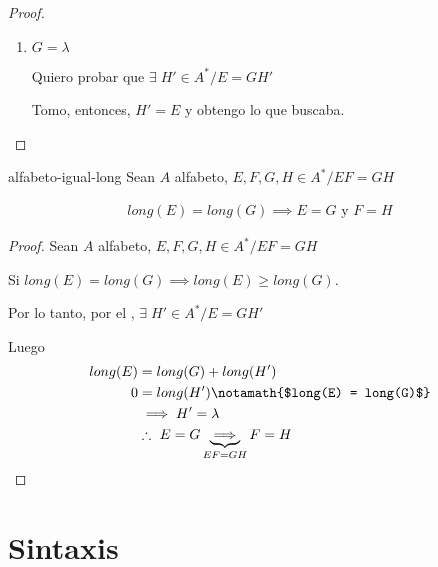 \begin{proof}
\begin{enumerate}[%
        labelindent=*,
        style=multiline,
        leftmargin=*,
        align=left,
        leftmargin=2\parindent,
        label=Caso \arabic*)]
            \begin{align*}
                \notamath{Por HI} 
                &\implies \exists \; H' \big/ \widetilde{E} = \widetilde{G} H' \\
                &\implies e_1 \widetilde{E} = g_1 \widetilde{G} H' \\
                &\implies E = GH'
            \end{align*}

        \item $G = \lambda$

            Quiero probar que $\exists \; H' \in A^{*} / E = GH'$

            Tomo, entonces, $H' = E$ y obtengo lo que buscaba.
    \end{enumerate}

\end{proof}

\begin{corolario}{}{alfabeto-igual-long}
    Sean $A$ alfabeto, $E, F, G, H \in A^{*} / EF = GH$

    \medskip

    \begin{gather*}
        long(E) = long(G) \implies E=G \text{ y } F=H
    \end{gather*}
\end{corolario}

\begin{proof} \phantom{.}

    Sean $A$ alfabeto, $E, F, G, H \in A^{*} / EF = GH$

    Si $long(E) = long(G) \implies long(E) \geq long(G)$.

    Por lo tanto, por el ,
    $\exists \; H' \in A^{*}/E=GH'$

    Luego
    \begin{align*}
        long(E) &= long(G) + long(H') \\
        0 &= long(H') \notamath{$long(E) = long(G)$}\\
          &\implies H' = \lambda \\
          &\therefore ~ E= G \underbrace{\implies}_{EF=GH} F = H 
    \end{align*}

\end{proof}

\pagebreak
\section{Sintaxis}

